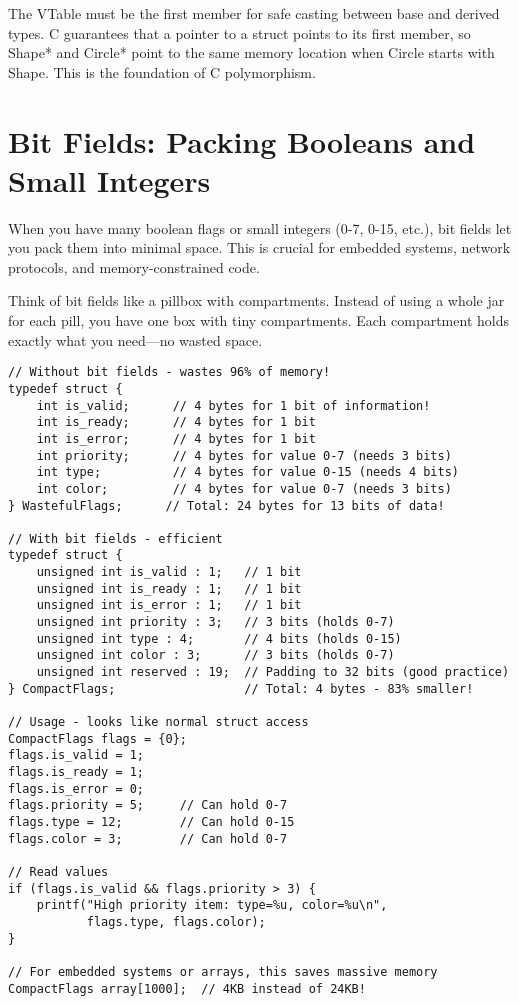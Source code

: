 \begin{tipbox}
The VTable must be the first member for safe casting between base and derived types. C guarantees that a pointer to a struct points to its first member, so Shape* and Circle* point to the same memory location when Circle starts with Shape. This is the foundation of C polymorphism.
\end{tipbox}

\section{Bit Fields: Packing Booleans and Small Integers}

When you have many boolean flags or small integers (0-7, 0-15, etc.), bit fields let you pack them into minimal space. This is crucial for embedded systems, network protocols, and memory-constrained code.

Think of bit fields like a pillbox with compartments. Instead of using a whole jar for each pill, you have one box with tiny compartments. Each compartment holds exactly what you need—no wasted space.

\begin{lstlisting}
// Without bit fields - wastes 96% of memory!
typedef struct {
    int is_valid;      // 4 bytes for 1 bit of information!
    int is_ready;      // 4 bytes for 1 bit
    int is_error;      // 4 bytes for 1 bit
    int priority;      // 4 bytes for value 0-7 (needs 3 bits)
    int type;          // 4 bytes for value 0-15 (needs 4 bits)
    int color;         // 4 bytes for value 0-7 (needs 3 bits)
} WastefulFlags;      // Total: 24 bytes for 13 bits of data!

// With bit fields - efficient
typedef struct {
    unsigned int is_valid : 1;   // 1 bit
    unsigned int is_ready : 1;   // 1 bit
    unsigned int is_error : 1;   // 1 bit
    unsigned int priority : 3;   // 3 bits (holds 0-7)
    unsigned int type : 4;       // 4 bits (holds 0-15)
    unsigned int color : 3;      // 3 bits (holds 0-7)
    unsigned int reserved : 19;  // Padding to 32 bits (good practice)
} CompactFlags;                  // Total: 4 bytes - 83% smaller!

// Usage - looks like normal struct access
CompactFlags flags = {0};
flags.is_valid = 1;
flags.is_ready = 1;
flags.is_error = 0;
flags.priority = 5;     // Can hold 0-7
flags.type = 12;        // Can hold 0-15
flags.color = 3;        // Can hold 0-7

// Read values
if (flags.is_valid && flags.priority > 3) {
    printf("High priority item: type=%u, color=%u\n",
           flags.type, flags.color);
}

// For embedded systems or arrays, this saves massive memory
CompactFlags array[1000];  // 4KB instead of 24KB!
\end{lstlisting}

